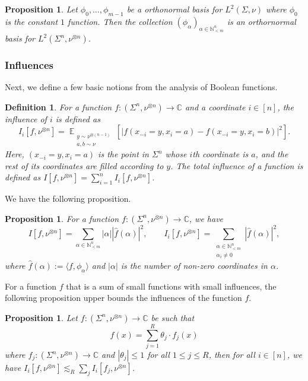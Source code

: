 \documentclass[10pt,a4paper]{amsart}
\newtheorem{definition}[thm]{Definition}
\newtheorem{proposition}[thm]{Proposition}
\newcommand\card[1]{\left| {#1} \right|}
\newcommand\Expect[2]{{\mathop{\mathbb{E}}_{#1}\left[ {#2} \right]}}
\renewcommand\leq{\leqslant}
\begin{document}
\begin{proposition}\label{prop:fourier_n}
	Let $\phi_0, \dots, \phi_{m-1}$ be a orthonormal basis for $L^2(\Sigma, \nu)$ where $\phi_0$ is the constant $1$ function. Then the collection $(\phi_{\alpha})_{\alpha \in \mathbb{N}^n_{<m}}$ is an orthornormal basis for $L^2(\Sigma^n, \nu^{\otimes n})$.
\end{proposition}
\subsubsection{Influences}

Next, we define a few basic notions from the analysis of Boolean functions.
\begin{definition}\label{def:influence}
	For a function $f\colon (\Sigma^n,\nu^{\otimes n})\to\mathbb{C}$ and a coordinate $i\in [n]$, the influence of
	$i$ is defined as
	\[
	I_i[f, \nu^{\otimes n}] = \Expect{\substack{y\sim \nu^{\otimes (n-1)}\\a,b\sim \nu}}{\card{f(x_{-i} = y, x_i = a)-f(x_{-i} = y, x_i = b)}^2}.
	\]
    Here, $(x_{-i} = y, x_i = a)$ is the point in $\Sigma^n$ whose $i$th coordinate is $a$, and the rest of its coordinates are filled according to $y$.
	The total influence of a function is defined as $I[f, \nu^{\otimes n}] = \sum_{i=1}^n I_i[f, \nu^{\otimes n}]$.
\end{definition}
We have the following proposition.
\begin{proposition}\label{prop:total_inf}
	For a function $f\colon (\Sigma^n,\nu^{\otimes n})\to\mathbb{C}$, we have
	\[
    I[f, \nu^{\otimes n}] = \sum_{\alpha \in \mathbb{N}^n_{<m}} \card{\alpha}\card{\hat{f}(\alpha)}^2,\quad\quad I_i[f, \nu^{\otimes n}]  = \sum_{\substack{\alpha \in \mathbb{N}^{n}_{<m}\\ \alpha_i \neq 0}} \card{\hat{f}(\alpha)}^2,
    \]
	where $\hat{f}(\alpha) := \langle f, \phi_\alpha\rangle$ and $\card{\alpha}$ is the number of non-zero coordinates in $\alpha$.
\end{proposition}
For a function $f$ that is a sum of small functions with small influences, the following proposition upper bounds the influences of the function $f$.
\begin{proposition}
    \label{prop:sum_inf}
    Let $f\colon (\Sigma^n,\nu^{\otimes n})\to\mathbb{C}$ be such that 
    $$f(x) = \sum_{j=1}^{R} \theta_j \cdot 
    f_j(x)$$
    where $f_j\colon (\Sigma^n,\nu^{\otimes n})\to\mathbb{C}$ and $|\theta_j|\leq 1$ for all $1\leq j\leq R$, then for all $i\in [n]$, we have $I_i[f, \nu^{\otimes n}] \lesssim_R \sum_{j}I_i[f_j, \nu^{\otimes n}]$.
\end{proposition}
\end{document}
